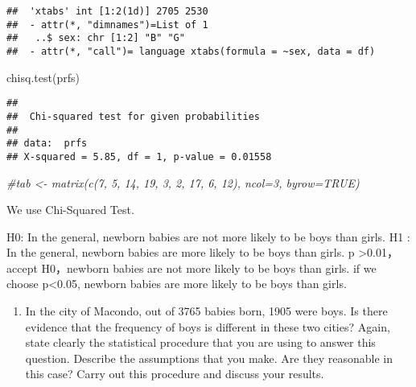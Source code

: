 \documentclass[
]{article}
\newenvironment{Shaded}{\begin{snugshade}}{\end{snugshade}}
\newcommand{\CommentTok}[1]{\textcolor[rgb]{0.56,0.35,0.01}{\textit{#1}}}
\newcommand{\FunctionTok}[1]{\textcolor[rgb]{0.00,0.00,0.00}{#1}}
\newcommand{\NormalTok}[1]{#1}
\providecommand{\tightlist}{%
  \setlength{\itemsep}{0pt}\setlength{\parskip}{0pt}}
\begin{document}
\begin{verbatim}
##  'xtabs' int [1:2(1d)] 2705 2530
##  - attr(*, "dimnames")=List of 1
##   ..$ sex: chr [1:2] "B" "G"
##  - attr(*, "call")= language xtabs(formula = ~sex, data = df)
\end{verbatim}

\begin{Shaded}
\begin{Highlighting}[]
\FunctionTok{chisq.test}\NormalTok{(prfs)}
\end{Highlighting}
\end{Shaded}

\begin{verbatim}
## 
##  Chi-squared test for given probabilities
## 
## data:  prfs
## X-squared = 5.85, df = 1, p-value = 0.01558
\end{verbatim}

\begin{Shaded}
\begin{Highlighting}[]
\CommentTok{\#tab \textless{}{-} matrix(c(7, 5, 14, 19, 3, 2, 17, 6, 12), ncol=3, byrow=TRUE)}
\end{Highlighting}
\end{Shaded}

We use Chi-Squared Test.

H0: In the general, newborn babies are not more likely to be boys than
girls. H1 : In the general, newborn babies are more likely to be boys
than girls. p \textgreater0.01，accept H0，newborn babies are not more
likely to be boys than girls. if we choose p\textless0.05, newborn
babies are more likely to be boys than girls.

\begin{enumerate}
\def\labelenumi{(\alph{enumi})}
\setcounter{enumi}{1}
\tightlist
\item
  In the city of Macondo, out of 3765 babies born, 1905 were boys. Is
  there evidence that the frequency of boys is different in these two
  cities? Again, state clearly the statistical procedure that you are
  using to answer this question. Describe the assumptions that you make.
  Are they reasonable in this case? Carry out this procedure and discuss
  your results.
\end{enumerate}
\end{document}
